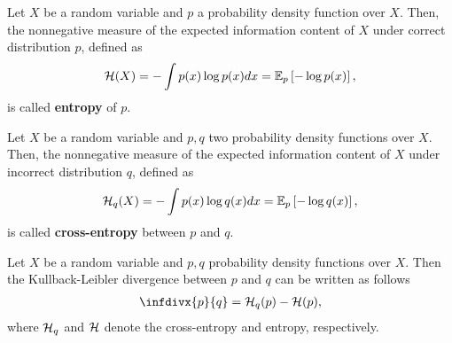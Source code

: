 \begin{definition}\label{def_entropy}
Let $X$ be a random variable and $p$ a probability density function over $X$. Then, the nonnegative measure of the expected information content of $X$ under correct distribution $p$, defined as
\begin{align}
\mathcal{H}(X) = -\int p(x) \log p(x)dx = \operatorname{\mathbb{E}}_p \left[ - \log p(x) \right],
\end{align}
is called \textbf{entropy} of $p$.
\end{definition}


\begin{definition}\label{def_cross_entropy}
Let $X$ be a random variable and $p, q$ two probability density functions over $X$. Then, the nonnegative measure of the expected information content of $X$ under incorrect distribution $q$, defined as
\begin{align}
\mathcal{H}_q(X) = -\int p(x) \log q(x)dx = \operatorname{\mathbb{E}}_p \left[ - \log q(x) \right],
\end{align}
is called \textbf{cross-entropy} between $p$ and $q$.
\end{definition}


\begin{remark}
Let $X$ be a random variable and $p, q$ probability density functions over $X$. Then the Kullback-Leibler divergence between $p$ and $q$ can be written as follows
\begin{align*}
\infdivx{p}{q} = \H_q(p) - \H(p),
\end{align*}
where $\mathcal{H}_q$ and $\mathcal{H}$ denote the cross-entropy and entropy, respectively.
\end{remark}

